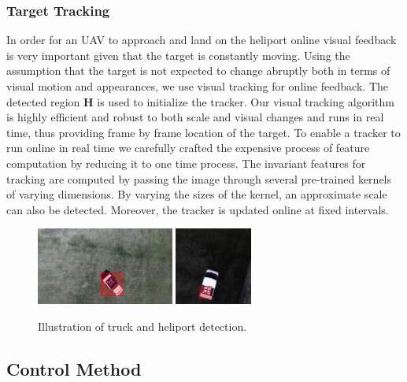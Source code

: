 \documentclass{standalone}
\begin{document}
\subsubsection{Target Tracking}

In order for an UAV to approach and land on the heliport online visual
feedback is very important given that the target is constantly moving.
Using the assumption that the target is not
expected to change abruptly both in terms of visual motion and
appearances, we use visual tracking for online feedback.
The detected region $\mathbf{H}$ is used to initialize the
tracker. Our visual tracking algorithm is highly efficient and robust
to both scale and visual changes and runs in real time, thus
providing frame by frame location of the target. To enable a tracker
to run online in real time we carefully crafted the expensive process
of feature computation by reducing it to one time process. 
The invariant features for tracking are computed by passing the image
through several pre-trained kernels of varying dimensions. By varying
the sizes of the kernel, an approximate scale can also be detected.
Moreover, the tracker is updated online at fixed intervals.

\begin{figure}[t!]
  \centering
  \includegraphics[height=1in]{sections/task1/images/detect2}
  \includegraphics[height=1in]{sections/task1/images/detect1}
  \caption{Illustration of truck and heliport detection.}
\end{figure}

\subsection{Control Method}
\end{document}
